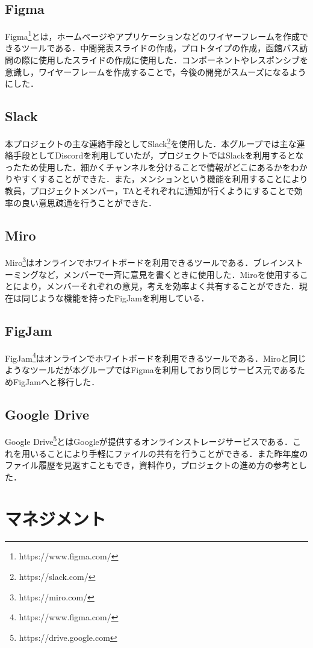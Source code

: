\documentclass[openany,11pt,papersize,dvipdfm]{jsbook}
\begin{document}
\begin{appendix}
\subsection{Figma}
Figma\footnote{https://www.figma.com/}とは，ホームページやアプリケーションなどのワイヤーフレームを作成できるツールである．中間発表スライドの作成，プロトタイプの作成，函館バス訪問の際に使用したスライドの作成に使用した．コンポーネントやレスポンシブを意識し，ワイヤーフレームを作成することで，今後の開発がスムーズになるようにした．
\subsection{Slack}
本プロジェクトの主な連絡手段としてSlack\footnote{https://slack.com/}を使用した．本グループでは主な連絡手段としてDiscordを利用していたが，プロジェクトではSlackを利用するとなったため使用した．細かくチャンネルを分けることで情報がどこにあるかをわかりやすくすることができた．また，メンションという機能を利用することにより教員，プロジェクトメンバー，TAとそれぞれに通知が行くようにすることで効率の良い意思疎通を行うことができた．
\subsection{Miro}
Miro\footnote{https://miro.com/}はオンラインでホワイトボードを利用できるツールである．ブレインストーミングなど，メンバーで一斉に意見を書くときに使用した．Miroを使用することにより，メンバーそれぞれの意見，考えを効率よく共有することができた．現在は同じような機能を持ったFigJamを利用している．
\subsection{FigJam}
FigJam\footnote{https://www.figma.com/}はオンラインでホワイトボードを利用できるツールである．Miroと同じようなツールだが本グループではFigmaを利用しており同じサービス元であるためFigJamへと移行した．
\subsection{Google Drive}
Google Drive\footnote{https://drive.google.com}とはGoogleが提供するオンラインストレージサービスである．これを用いることにより手軽にファイルの共有を行うことができる．また昨年度のファイル履歴を見返すこともでき，資料作り，プロジェクトの進め方の参考とした．

\section{マネジメント}

\end{appendix}
\end{document}
